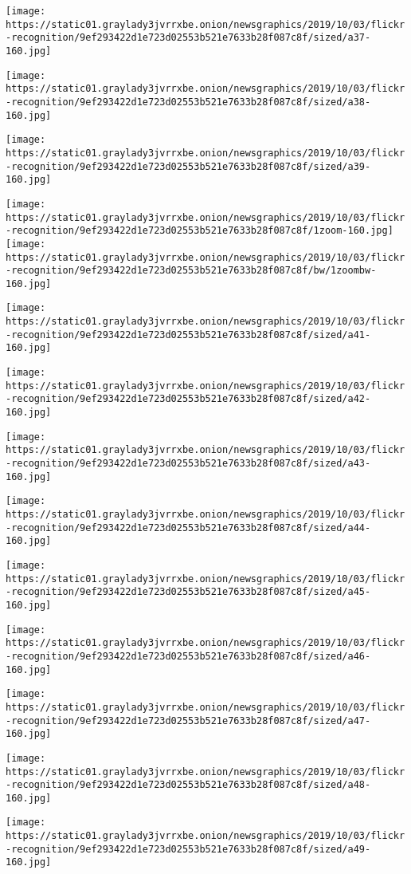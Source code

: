 \texttt{[image: https://static01.graylady3jvrrxbe.onion/newsgraphics/2019/10/03/flickr-recognition/9ef293422d1e723d02553b521e7633b28f087c8f/sized/a37-160.jpg]}

\texttt{[image: https://static01.graylady3jvrrxbe.onion/newsgraphics/2019/10/03/flickr-recognition/9ef293422d1e723d02553b521e7633b28f087c8f/sized/a38-160.jpg]}

\texttt{[image: https://static01.graylady3jvrrxbe.onion/newsgraphics/2019/10/03/flickr-recognition/9ef293422d1e723d02553b521e7633b28f087c8f/sized/a39-160.jpg]}

\texttt{[image: https://static01.graylady3jvrrxbe.onion/newsgraphics/2019/10/03/flickr-recognition/9ef293422d1e723d02553b521e7633b28f087c8f/1zoom-160.jpg]}\texttt{[image: https://static01.graylady3jvrrxbe.onion/newsgraphics/2019/10/03/flickr-recognition/9ef293422d1e723d02553b521e7633b28f087c8f/bw/1zoombw-160.jpg]}

\texttt{[image: https://static01.graylady3jvrrxbe.onion/newsgraphics/2019/10/03/flickr-recognition/9ef293422d1e723d02553b521e7633b28f087c8f/sized/a41-160.jpg]}

\texttt{[image: https://static01.graylady3jvrrxbe.onion/newsgraphics/2019/10/03/flickr-recognition/9ef293422d1e723d02553b521e7633b28f087c8f/sized/a42-160.jpg]}

\texttt{[image: https://static01.graylady3jvrrxbe.onion/newsgraphics/2019/10/03/flickr-recognition/9ef293422d1e723d02553b521e7633b28f087c8f/sized/a43-160.jpg]}

\texttt{[image: https://static01.graylady3jvrrxbe.onion/newsgraphics/2019/10/03/flickr-recognition/9ef293422d1e723d02553b521e7633b28f087c8f/sized/a44-160.jpg]}

\texttt{[image: https://static01.graylady3jvrrxbe.onion/newsgraphics/2019/10/03/flickr-recognition/9ef293422d1e723d02553b521e7633b28f087c8f/sized/a45-160.jpg]}

\texttt{[image: https://static01.graylady3jvrrxbe.onion/newsgraphics/2019/10/03/flickr-recognition/9ef293422d1e723d02553b521e7633b28f087c8f/sized/a46-160.jpg]}

\texttt{[image: https://static01.graylady3jvrrxbe.onion/newsgraphics/2019/10/03/flickr-recognition/9ef293422d1e723d02553b521e7633b28f087c8f/sized/a47-160.jpg]}

\texttt{[image: https://static01.graylady3jvrrxbe.onion/newsgraphics/2019/10/03/flickr-recognition/9ef293422d1e723d02553b521e7633b28f087c8f/sized/a48-160.jpg]}

\texttt{[image: https://static01.graylady3jvrrxbe.onion/newsgraphics/2019/10/03/flickr-recognition/9ef293422d1e723d02553b521e7633b28f087c8f/sized/a49-160.jpg]}

